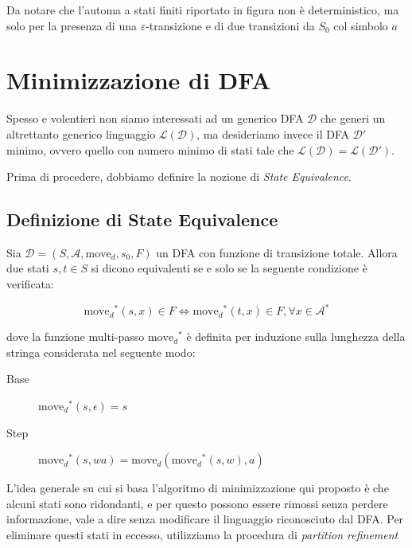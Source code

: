 \documentclass[class=book, crop=false, oneside, 12pt]{standalone}
\begin{document}
Da notare che l'automa a stati finiti riportato in figura non è deterministico, ma solo per la presenza di una \(\varepsilon\)-transizione e di due transizioni da \(S_{0}\) col simbolo \(a\)

\section{Minimizzazione di DFA}
Spesso e volentieri non siamo interessati ad un generico DFA \(\mathcal{D}\) che generi un altrettanto generico linguaggio \(\mathcal{L(D)}\), ma desideriamo invece il DFA \(\mathcal{D}'\) minimo, ovvero quello con numero minimo di stati tale che \(\mathcal{L(D)} = \mathcal{L(D')}\). 


Prima di procedere, dobbiamo definire la nozione di \emph{State Equivalence}.

\subsection{Definizione di State Equivalence}

\begin{definition}
    Sia \(\mathcal{D} = (S,\mathcal{A},\textrm{move}_{d},s_{0},F)\) un DFA con funzione di transizione totale. Allora due stati \(s,t \in S\) si dicono equivalenti se e solo se la seguente condizione è verificata:

    \begin{equation}
        \textrm{move}_{d}\!^{*}(s,x) \in F \iff \textrm{move}_{d}\!^{*}(t,x) \in F,  \forall x \in \mathcal{A}^{*} 
    \end{equation}
    
    \noindent dove la funzione multi-passo \(\textrm{move}_{d}\!^{*}\) è definita per induzione sulla lunghezza della stringa considerata nel seguente modo:

    \begin{description}
        \item[Base] \(\textrm{move}_{d}\!^{*}(s,\epsilon)=s\) 
        \item[Step] \(\textrm{move}_{d}\!^{*}(s,wa)= \textrm{move}_{d}(\textrm{move}_{d}\!^{*}(s,w),a)\)
    \end{description}    
\end{definition}

L'idea generale su cui si basa l'algoritmo di minimizzazione qui proposto è che alcuni stati sono ridondanti, e per questo possono essere rimossi senza perdere informazione, vale a dire senza modificare il linguaggio riconosciuto dal DFA. Per eliminare questi stati in eccesso, utilizziamo la procedura di \emph{partition refinement}
\end{document}
